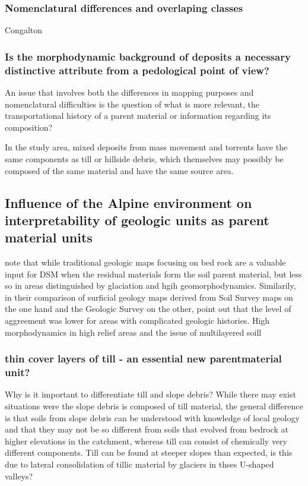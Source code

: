 \documentclass[preprint,12pt,authoryear]{elsarticle}
\begin{document}
\subsubsection{Nomenclatural differences and overlaping classes}
Congalton 


\subsubsection{Is the morphodynamic background of deposits a necessary distinctive attribute from a pedological point of view?}
An issue that involves both the differences in mapping purposes and nomenclatural difficulties is the question of what is more relevant,  the transportational history of a parent material or information regarding its composition?

In the study area, mixed deposits from mass movement and torrents have the same components as till or hillside debris, which themselves may possibly be composed of the same material and have the same source area.

\subsection{Influence of the Alpine environment on interpretability of geologic units as parent material units}
\cite{Heung2014} note that while traditional geologic maps focusing on bed rock are a valuable input for DSM when the residual materials form the soil parent material, but less so in areas distinguished by glaciation and hgih geomorphodynamics. Similarily, in their comparison of surficial geology maps derived from Soil Survey maps on the one hand and the Geologic Survey on the other, \cite{Miller2015a} point out that the level of aggreement was lower for areas with complicated geologic histories.
High morphodynamics in high relief areas and the issue of  multilayered soill


\subsubsection{thin cover layers of till - an essential new parentmaterial unit?}
Why is it important to differentiate till and slope debris? While there may exist situations were the slope debris is composed of till material, the general difference is that soils from slope debris can be understood with knowledge of local geology and that they may not be so different from soils  that evolved from bedrock at higher elevations  in the catchment, whereas till can consist of chemically very different components.
Till can be found at steeper slopes than expected, is this due to lateral consolidation of tillic material by glaciers in thses U-shaped valleys?
\end{document}
